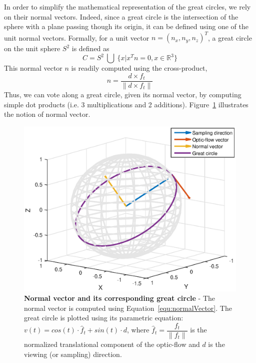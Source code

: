 In order to simplify the mathematical representation of the great circles, we rely on their normal vectors. Indeed, since a great circle is the intersection of the sphere with a plane passing though its origin, it can be defined using one of the unit normal vectors.
Formally, for a unit vector $n = (n_x, n_y, n_z)^T$, a great circle on the unit sphere $S^2$ is defined as
\begin{equation}
C = S^2~\bigcup~\{ x|x^Tn = 0, x \in \mathbb{R}^3 \}
\end{equation}
This normal vector $n$ is readily computed using the cross-product,
\begin{equation}
n = \dfrac{d \times f_t}{\|d \times f_t\|}
\label{equ:normalVector}
\end{equation}
Thus, we can vote along a great circle, given its normal vector, by computing simple dot products (i.e. 3 multiplications and 2 additions). Figure~\ref{fig:normalVector} illustrates the notion of normal vector.

\begin{figure}
\centering
\includegraphics[width=0.7\linewidth]{images/matlab/normalVector}
\caption{\textbf{Normal vector and its corresponding great circle} - The normal vector is computed using Equation~\ref{equ:normalVector}. The great circle is plotted using its parametric equation: $v(t) = cos(t) \cdot \hat{f}_t + sin(t) \cdot d$, where $\hat{f}_t = \dfrac{f_t}{\|f_t\|}$ is the normalized translational component of the optic-flow and $d$ is the viewing (or sampling) direction. \label{fig:normalVector}}
\end{figure}

